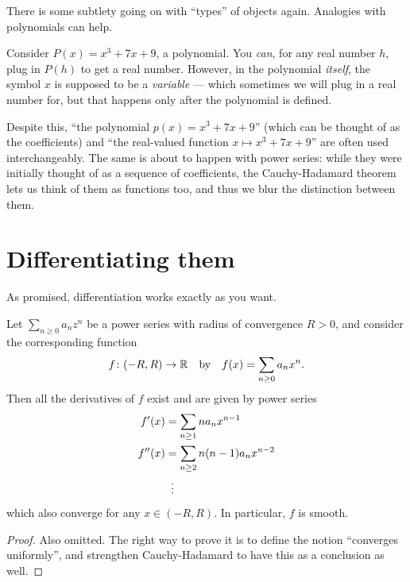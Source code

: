 \begin{abuse}
	There is some subtlety going on with ``types'' of objects again.
	Analogies with polynomials can help.

	Consider $P(x) = x^3 + 7x + 9$, a polynomial.
	You \emph{can}, for any real number $h$,
	plug in $P(h)$ to get a real number.
	However, in the polynomial \emph{itself},
	the symbol $x$ is supposed to be a \emph{variable} ---
	which sometimes we will plug in a real number for,
	but that happens only after the polynomial is defined.

	Despite this, ``the polynomial $p(x) = x^3+7x+9$''
	(which can be thought of as the coefficients)
	and ``the real-valued function $x \mapsto x^3+7x+9$''
	are often used interchangeably.
	The same is about to happen with power series:
	while they were initially thought of as a sequence of
	coefficients, the Cauchy-Hadamard theorem
	lets us think of them as functions too,
	and thus we blur the distinction between them.
%
\end{abuse}

\section{Differentiating them}
As promised, differentiation works exactly as you want.

\begin{theorem}
	Let $\sum_{n \ge 0} a_n z^n$ be a power series with radius of convergence $R > 0$,
	and consider the corresponding function
	\[ f \colon (-R,R) \to \mathbb R \quad\text{by}\quad
		f(x) = \sum_{n \ge 0} a_n x^n. \]
	Then all the derivatives of $f$ exist and are given by power series
	\begin{align*}
		f'(x) &= \sum_{n \ge 1} n a_n x^{n-1} \\
		f''(x) &= \sum_{n \ge 2} n(n-1) a_n x^{n-2} \\
		&\vdotswithin=
	\end{align*}
	which also converge for any $x \in (-R, R)$.
	In particular, $f$ is smooth.
\end{theorem}
\begin{proof}
	Also omitted.
	The right way to prove it is to define the notion ``converges uniformly'',
	and strengthen Cauchy-Hadamard to have this as a conclusion as well.
\end{proof}

